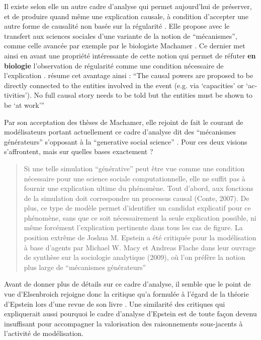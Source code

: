 Il existe selon elle un autre cadre d'analyse qui permet aujourd'hui de préserver, et de produire quand même une explication causale, à condition d'accepter une autre forme de causalité non basée sur la régularité . Elle propose avec \textcite{Hedstrom2010} le transfert aux sciences sociales d'une variante de la notion de \enquote{mécanismes}, comme celle avancée par exemple par le biologiste Machamer \textcite{Machamer2000}. Ce dernier met ainsi en avant une propriété intéressante de cette notion qui permet de réfuter \textbf{en biologie} l'observation de régularité comme une condition nécessaire de l'explication . \textcite{Elsenbroich2012} résume cet avantage ainsi : \foreignquote{english}{The causal powers are proposed to be directly connected to the entities involved in the event (e.g. via \enquote{capacities} or \enquote{activities}). No full causal story needs to be told but the entities must be shown to be \enquote{at work}}

Par son acceptation des thèses de Machamer, elle rejoint de fait le courant de modélisateurs portant actuellement ce cadre d'analyse dit des \enquote{mécanismes générateurs} \autocites{Hedstrom2010, Manzo2007} s'opposant à la \enquote{generative social science} \autocite{Epstein1999}. Pour \textcite[698]{Livet2014} ces deux visions s'affrontent, mais sur quelles bases exactement ?

\blockquote[\cite{Livet2014}]{Si une telle simulation \enquote{générative} peut être vue comme une condition nécessaire pour une science sociale computationnelle, elle ne suffit pas à fournir une explication ultime du phénomène. Tout d’abord, aux fonctions de la simulation doit correspondre un processus causal (Conte, 2007). De plus, ce type de modèle permet d’identifier un candidat explicatif pour ce phénomène, sans que ce soit nécessairement la seule explication possible, ni même forcément l’explication pertinente dans tous les cas de figure. La position extrême de Joshua M. Epstein a été critiquée pour la modélisation à base d’agents par Michael W. Macy et Andreas Flache dans leur ouvrage de synthèse sur la sociologie analytique (2009), où l’on préfère la notion plus large de \enquote{mécanismes générateurs}}

Avant de donner plus de détails sur ce cadre d'analyse, il semble que le point de vue d'Elsenbroich rejoigne donc la critique qu'a formulée \textcite{Conte2007} à l'égard de la théorie d'Epstein lors d'une revue de son livre \autocite{Epstein2007d}. Une similarité des critiques qui expliquerait aussi pourquoi le cadre d'analyse d'Epstein est de toute façon devenu insuffisant pour accompagner la valorisation des raisonnements sous-jacents à l'activité de modélisation.

